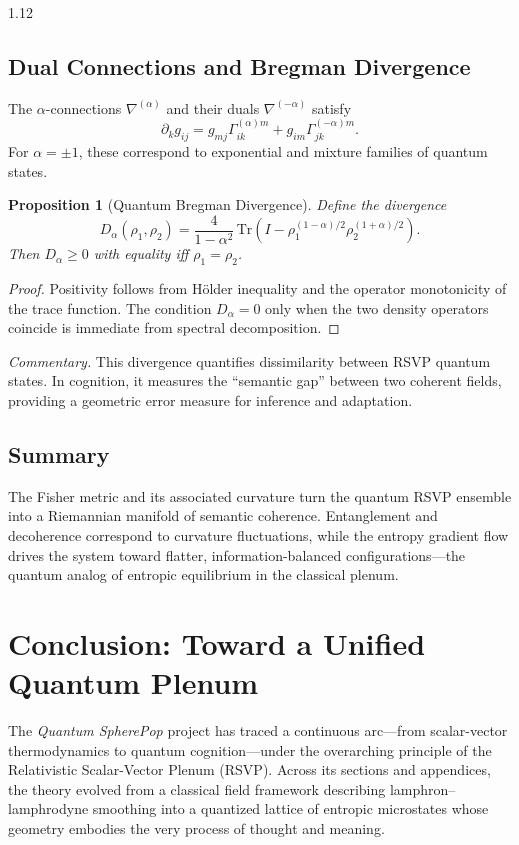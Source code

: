 \documentclass[12pt,a4paper]{article}
\numberwithin{equation}{section}
\newtheorem{proposition}{Proposition}[section]
\theoremstyle{remark}
\theoremstyle{definition}
\begin{document}
\begin{spacing}{1.12}
\subsection{Dual Connections and Bregman Divergence}

The $\alpha$-connections
\(\nabla^{(\alpha)}\) and their duals \(\nabla^{(-\alpha)}\)
satisfy
\[
\partial_k g_{ij}
= g_{mj}\Gamma^{(\alpha)m}_{ik} + g_{im}\Gamma^{(-\alpha)m}_{jk}.
\]
For $\alpha=\pm1$, these correspond to exponential and mixture families
of quantum states.

\begin{proposition}[Quantum Bregman Divergence]\label{prop:bregman}
Define the divergence
\[
D_\alpha(\rho_1,\rho_2)
= \frac{4}{1-\alpha^2}\,
\mathrm{Tr}\!\left(
I - \rho_1^{(1-\alpha)/2}\rho_2^{(1+\alpha)/2}
\right).
\]
Then \(D_\alpha\ge0\) with equality iff \(\rho_1=\rho_2\).
\end{proposition}

\begin{proof}
Positivity follows from Hölder inequality and the operator
monotonicity of the trace function.
The condition \(D_\alpha=0\) only when the two density operators coincide
is immediate from spectral decomposition.
\end{proof}

\noindent\textit{Commentary.}
This divergence quantifies dissimilarity between RSVP quantum states.
In cognition, it measures the “semantic gap” between two coherent fields,
providing a geometric error measure for inference and adaptation.

\subsection{Summary}

The Fisher metric and its associated curvature
turn the quantum RSVP ensemble into a Riemannian manifold of
semantic coherence.
Entanglement and decoherence correspond to curvature fluctuations,
while the entropy gradient flow drives the system toward flatter,
information-balanced configurations—the quantum analog
of entropic equilibrium in the classical plenum.

\section*{Conclusion: Toward a Unified Quantum Plenum}

The \emph{Quantum SpherePop} project has traced a continuous arc—from scalar-vector thermodynamics to quantum cognition—under the overarching principle of the Relativistic Scalar-Vector Plenum (RSVP).  
Across its sections and appendices, the theory evolved from a classical field framework describing lamphron–lamphrodyne smoothing into a quantized lattice of entropic microstates whose geometry embodies the very process of thought and meaning.


\end{spacing}
\end{document}
